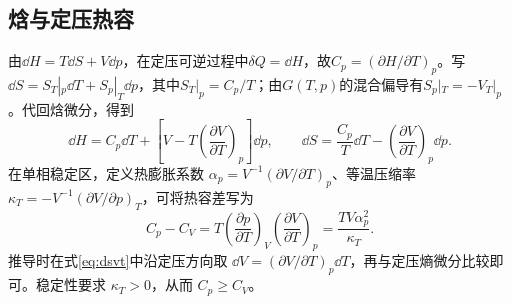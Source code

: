 \subsection{焓与定压热容}
\label{th:enthalpy}
由$\dd H=T\dd S+V\dd p$，在定压可逆过程中$\delta Q=\dd H$，故$C_p=(\partial H/\partial T)_p$。写$\dd S=S_T|_p\dd T+S_p|_T\dd p$，其中$S_T|_p=C_p/T$；由$G(T,p)$的混合偏导有$S_p|_T=-V_T|_p$。代回焓微分，得到
\begin{equation}\label{eq:dhpt}
 \dd H=C_p\dd T+
 \left[V-T\left(\frac{\partial V}{\partial T}\right)_p\right]\dd p,
 \qquad
 \dd S=\frac{C_p}{T}\dd T-
 \left(\frac{\partial V}{\partial T}\right)_p\dd p.
\end{equation}
在单相稳定区，定义热膨胀系数 $\alpha_p=V^{-1}(\partial V/\partial T)_p$、等温压缩率 $\kappa_T=-V^{-1}(\partial V/\partial p)_T$，可将热容差写为
\begin{equation}\label{eq:cpminuscv}
 C_p-C_V=T\left(\frac{\partial p}{\partial T}\right)_V
 \left(\frac{\partial V}{\partial T}\right)_p
 =\frac{TV\alpha_p^2}{\kappa_T}.
\end{equation}
推导时在式\eqref{eq:dsvt}中沿定压方向取 $\dd V=(\partial V/\partial T)_p\dd T$，再与定压熵微分比较即可。稳定性要求 $\kappa_T>0$，从而 $C_p\ge C_V$。

